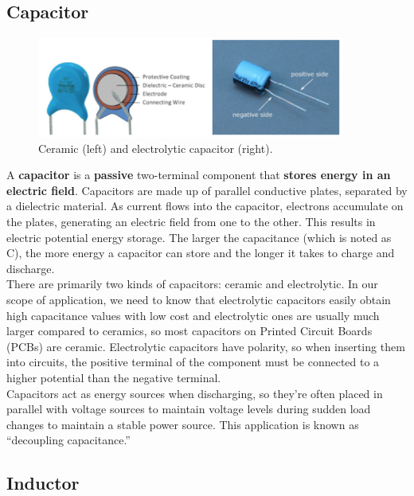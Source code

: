 \documentclass{article}
\begin{document}
\subsection{Capacitor}

\begin{figure} [h]
    \centering
    \includegraphics[width=0.9\textwidth]{img/Capacitors.png}
    \caption{Ceramic (left) and electrolytic capacitor (right).}
    \label{fig:capacitor}
\end{figure}

A \textbf{capacitor} is a \textbf{passive} two-terminal component that \textbf{stores energy in an electric field}. Capacitors are made up of parallel conductive
plates, separated by a dielectric material. As current flows into the capacitor, electrons accumulate on the plates, generating an electric field from one
to the other. This results in electric potential energy storage.
The larger the capacitance (which is noted as C), the more energy a capacitor can store and the longer it takes to charge and discharge.\\

There are primarily two kinds of capacitors: ceramic and electrolytic. In our scope of application, we need to know that electrolytic 
capacitors easily obtain high capacitance values with low cost and electrolytic ones are usually much larger compared to ceramics,
so most capacitors on Printed Circuit Boards (PCBs) are ceramic. Electrolytic capacitors have polarity, so when inserting them into circuits, the
positive terminal of the component must be connected to a higher potential than the negative terminal. \\

Capacitors act as energy sources when discharging, so they’re often placed in parallel with voltage sources to maintain voltage levels during 
sudden load changes to maintain a stable power source. This application is known as “decoupling capacitance.”


\subsection{Inductor}
\end{document}
